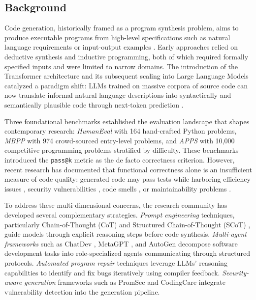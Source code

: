 \documentclass[11pt,a4paper]{article}
\begin{document}
\subsection{Background}
\label{sec:background}

Code generation, historically framed as a program synthesis problem, aims to produce executable programs from high-level specifications such as natural language requirements or input-output examples \cite{chen2021humaneval,austin2021mbpp}. Early approaches relied on deductive synthesis and inductive programming, both of which required formally specified inputs and were limited to narrow domains. The introduction of the Transformer architecture and its subsequent scaling into Large Language Models catalyzed a paradigm shift: LLMs trained on massive corpora of source code can now translate informal natural language descriptions into syntactically and semantically plausible code through next-token prediction \cite{chen2021humaneval}.

Three foundational benchmarks established the evaluation landscape that shapes contemporary research: \textit{HumanEval} \cite{chen2021humaneval} with 164 hand-crafted Python problems, \textit{MBPP} \cite{austin2021mbpp} with 974 crowd-sourced entry-level problems, and \textit{APPS} \cite{hendrycks2021apps} with 10,000 competitive programming problems stratified by difficulty. These benchmarks introduced the \texttt{pass@k} metric as the de facto correctness criterion. However, recent research has documented that functional correctness alone is an insufficient measure of code quality: generated code may pass tests while harboring efficiency issues \cite{jonnala2025}, security vulnerabilities \cite{bruni2025,ding2025codingcare}, code smells \cite{zhang2024copilot}, or maintainability problems \cite{zhang2025anncoder}.

To address these multi-dimensional concerns, the research community has developed several complementary strategies. \textit{Prompt engineering} techniques, particularly Chain-of-Thought (CoT) \cite{wei2022cot} and Structured Chain-of-Thought (SCoT) \cite{li2025scot}, guide models through explicit reasoning steps before code synthesis. \textit{Multi-agent frameworks} such as ChatDev \cite{qian2023chatdev}, MetaGPT \cite{hong2023metagpt}, and AutoGen \cite{wu2023autogen} decompose software development tasks into role-specialized agents communicating through structured protocols. \textit{Automated program repair} techniques \cite{xia2023apr,chen2023selfdebug,wang2024intervenor} leverage LLMs' reasoning capabilities to identify and fix bugs iteratively using compiler feedback. \textit{Security-aware generation} frameworks such as PromSec \cite{nazzal2024promsec} and CodingCare \cite{ding2025codingcare} integrate vulnerability detection into the generation pipeline.
\end{document}
